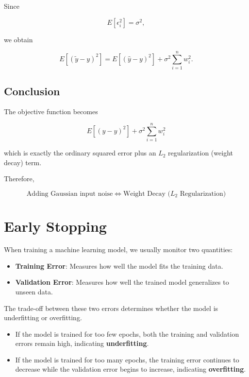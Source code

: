 \documentclass[11pt]{article}
\begin{document}
	Since
	
	\[
	E[\epsilon_i^2]=\sigma^2,
	\]
	
	we obtain
	
	\[
	E[(\tilde{y}-y)^2]
	=
	E[(\hat{y}-y)^2]
	+
	\sigma^2
	\sum_{i=1}^{n}w_i^2.
	\]
	
	\subsection*{Conclusion}
	
	The objective function becomes
	
	\[
	\boxed{
		E[(\hat{y}-y)^2]
		+
		\sigma^2
		\sum_{i=1}^{n}w_i^2
	}
	\]
	
	which is exactly the ordinary squared error plus an
	$L_2$ regularization (weight decay) term.
	
	Therefore,
	
	\[
	\boxed{
		\text{Adding Gaussian input noise}
		\Longleftrightarrow
		\text{Weight Decay (}L_2\text{ Regularization)}
	}
	\]
	
	
\section{Early Stopping}

When training a machine learning model, we usually monitor two quantities:

\begin{itemize}
	\item \textbf{Training Error}: Measures how well the model fits the training data.
	\item \textbf{Validation Error}: Measures how well the trained model generalizes to unseen data.
\end{itemize}

The trade-off between these two errors determines whether the model is
underfitting or overfitting.

\begin{itemize}
	\item If the model is trained for too few epochs, both the training and validation errors remain high, indicating \textbf{underfitting}.
	\item If the model is trained for too many epochs, the training error continues to decrease while the validation error begins to increase, indicating \textbf{overfitting}.
\end{itemize}
\end{document}
